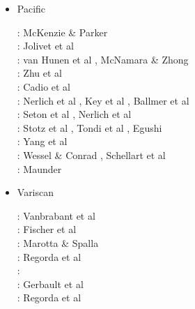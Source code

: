 \begin{itemize}
\item Pacific 


\begin{scriptsize}
\nineteensixtyseven: McKenzie \& Parker \cite{mcpa67}\\
\nineteenninety: Jolivet et al \cite{jodc90}\\
\twothousandfive: van Hunen et al \cite{vazs05}, McNamara \& Zhong \cite{mczh05a}\\
\twothousandten: Zhu et al \cite{zhst10}\\
\twothousandeleven: Cadio et al \cite{capd11}\\
\twothousandthirteen: Nerlich et al \cite{necb13}, Key et al \cite{kecl13}, Ballmer et al \cite{bacs13}\\
\twothousandfifteen: Seton et al \cite{sefw15}, Nerlich et al \cite{necb15}\\
\twothousandseventeen: Stotz et al \cite{stid17}, Tondi et al \cite{togr17}, Egushi \cite{egim17}\\
\twothousandeighteen: Yang et al \cite{yamz18}\\
\twothousandnineteen: Wessel \& Conrad \cite{weco19}, Schellart et al \cite{sccs19}\\
\twothousandtwenty: Maunder \cite{mapg20}
\end{scriptsize}



\item Variscan 

\begin{scriptsize}
\nineteenninetynine: Vanbrabant et al \cite{vajh99}\\
\twothousandfour: Fischer et al \cite{fijj04} \\
\twothousandseven: Marotta \& Spalla \cite{masp07} \\
\twothousandthirteen: Regorda et al \cite{rems13} \\
\twothousandseventeen: \cite{regorda} \\
\twothousandeighteen: Gerbault et al \cite{gesr18} \\
\twothousandtwenty: Regorda et al \cite{relr20}
\end{scriptsize}


\end{itemize}






